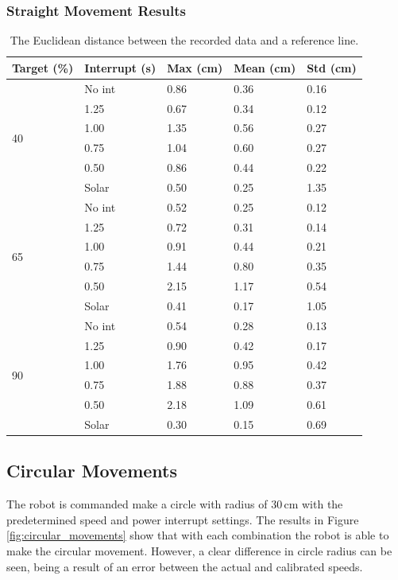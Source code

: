 \subsubsection{Straight Movement Results}

\begin{table}[t]
	\centering
	\caption{The Euclidean distance between the recorded data and a reference line.}
	\label{tab:straight_results}
	\begin{tabular}{|l|l||l|l|l|}
		\hline
		Target (\%) & Interrupt (s) & Max (cm) & Mean (cm) & Std (cm)\\
		\hline \hline
		\multirow{6}{*}{40} & No int & 0.86 & 0.36 & 0.16 \\
		& 1.25 & 0.67 & 0.34 & 0.12 \\
		& 1.00 & 1.35 & 0.56 & 0.27 \\
		& 0.75 & 1.04 & 0.60 & 0.27 \\
		& 0.50 & 0.86 & 0.44 & 0.22 \\
		& Solar & 0.50 & 0.25 & 1.35 \\
		\hline
		\multirow{6}{*}{65} & No int & 0.52 & 0.25 & 0.12 \\
		& 1.25 & 0.72 & 0.31 & 0.14 \\
		& 1.00 & 0.91 & 0.44 & 0.21 \\
		& 0.75 & 1.44 & 0.80 & 0.35 \\
		& 0.50 & 2.15 & 1.17 & 0.54 \\
		& Solar & 0.41 & 0.17 & 1.05 \\
		\hline
		\multirow{6}{*}{90} & No int & 0.54 & 0.28 & 0.13 \\
		& 1.25 & 0.90 & 0.42 & 0.17 \\
		& 1.00 & 1.76 & 0.95 & 0.42 \\
		& 0.75 & 1.88 & 0.88 & 0.37 \\
		& 0.50 & 2.18 & 1.09 & 0.61 \\
		& Solar & 0.30 & 0.15 & 0.69 \\
		\hline
	\end{tabular}
\end{table}

\subsection{Circular Movements}

The robot is commanded make a circle with radius of 30\,cm with the predetermined speed and power interrupt settings.
The results in Figure \ref{fig:circular_movements} show that with each combination the robot is able to make the circular movement.
However, a clear difference in circle radius can be seen, being a result of an error between the actual and calibrated speeds.


